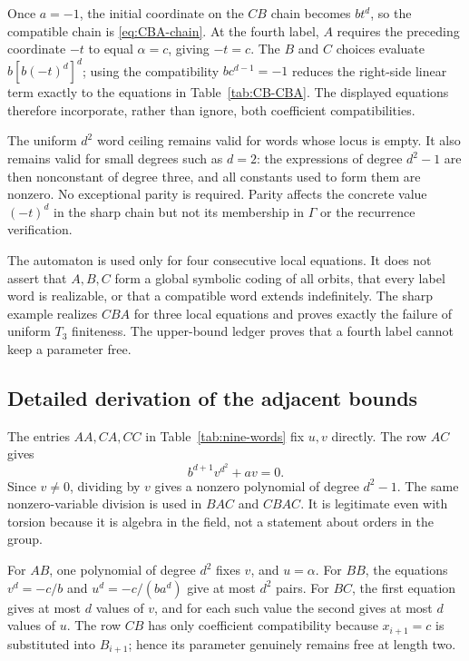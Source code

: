 \documentclass[11pt]{article}
\theoremstyle{definition}
\begin{document}
Once \(a=-1\), the initial coordinate on the \(CB\) chain becomes \(bt^d\), so the compatible chain is \eqref{eq:CBA-chain}. At the fourth label, \(A\) requires the preceding coordinate \(-t\) to equal \(\alpha=c\), giving \(-t=c\). The \(B\) and \(C\) choices evaluate \(b[b(-t)^d]^d\); using the compatibility \(bc^{d-1}=-1\) reduces the right-side linear term exactly to the equations in Table~\ref{tab:CB-CBA}. The displayed equations therefore incorporate, rather than ignore, both coefficient compatibilities.

The uniform \(d^2\) word ceiling remains valid for words whose locus is empty. It also remains valid for small degrees such as \(d=2\): the expressions of degree \(d^2-1\) are then nonconstant of degree three, and all constants used to form them are nonzero. No exceptional parity is required. Parity affects the concrete value \((-t)^d\) in the sharp chain but not its membership in \(\Gamma\) or the recurrence verification.

The automaton is used only for four consecutive local equations. It does not assert that \(A,B,C\) form a global symbolic coding of all orbits, that every label word is realizable, or that a compatible word extends indefinitely. The sharp example realizes \(CBA\) for three local equations and proves exactly the failure of uniform \(T_3\) finiteness. The upper-bound ledger proves that a fourth label cannot keep a parameter free.


\subsection{Detailed derivation of the adjacent bounds}

The entries \(AA,CA,CC\) in Table~\ref{tab:nine-words} fix \(u,v\) directly. The row \(AC\) gives
\[
 b^{d+1}v^{d^2}+av=0.
\]
Since \(v\neq0\), dividing by \(v\) gives a nonzero polynomial of degree \(d^2-1\). The same nonzero-variable division is used in \(BAC\) and \(CBAC\). It is legitimate even with torsion because it is algebra in the field, not a statement about orders in the group.

For \(AB\), one polynomial of degree \(d^2\) fixes \(v\), and \(u=\alpha\). For \(BB\), the equations \(v^d=-c/b\) and \(u^d=-c/(ba^d)\) give at most \(d^2\) pairs. For \(BC\), the first equation gives at most \(d\) values of \(v\), and for each such value the second gives at most \(d\) values of \(u\). The row \(CB\) has only coefficient compatibility because \(x_{i+1}=c\) is substituted into \(B_{i+1}\); hence its parameter genuinely remains free at length two.
\end{document}
